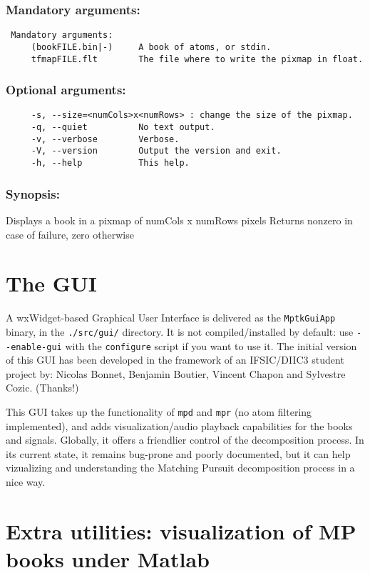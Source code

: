 \documentclass[11pt,a4paper]{article}
\begin{document}
\subsubsection*{Mandatory arguments:}
\begin{verbatim}
 Mandatory arguments:
     (bookFILE.bin|-)     A book of atoms, or stdin.
     tfmapFILE.flt        The file where to write the pixmap in float.
\end{verbatim}

\subsubsection*{Optional arguments:}
\begin{verbatim}
     -s, --size=<numCols>x<numRows> : change the size of the pixmap.
     -q, --quiet          No text output.
     -v, --verbose        Verbose.
     -V, --version        Output the version and exit.
     -h, --help           This help.
\end{verbatim}


\subsubsection*{Synopsis:}
Displays a book in a pixmap of numCols x numRows pixels Returns nonzero in case
of failure, zero otherwise


\clearpage
\section{The GUI \label{gui}}
A wxWidget-based Graphical User Interface is delivered as the \verb+MptkGuiApp+
binary, in the \verb+./src/gui/+ directory. It is not compiled/installed by
default: use \verb+--enable-gui+ with the \verb+configure+ script if you want
to use it. The initial version of this GUI has been developed in the framework
of an IFSIC/DIIC3 student project by: Nicolas Bonnet, Benjamin Boutier, Vincent
Chapon and Sylvestre Cozic. (Thanks!)

This GUI takes up the functionality of \verb+mpd+ and \verb+mpr+ (no atom
filtering implemented), and adds visualization/audio playback capabilities for
the books and signals. Globally, it offers a friendlier control of the
decomposition process. In its current state, it remains bug-prone and poorly
documented, but it can help vizualizing and understanding the Matching Pursuit
decomposition process in a nice way.


\section{Extra utilities: visualization of MP books under Matlab \label{matlab}}
\end{document}

